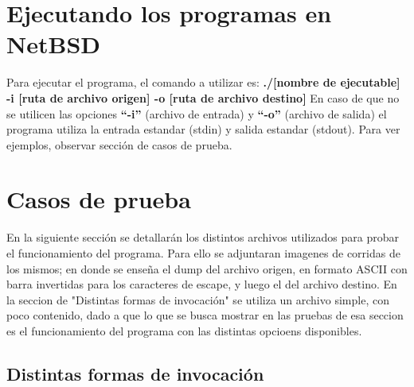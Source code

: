 \documentclass[a4paper,10pt]{article}
\begin{document}
\section{Ejecutando los programas en NetBSD}
  Para ejecutar el programa, el comando a utilizar es:
  \newline
  {\bf./[nombre de ejecutable] -i [ruta de archivo origen] -o [ruta de archivo destino]}
  \newline
  En caso de que no se utilicen las opciones {\bf ``-i''} (archivo de entrada) y {\bf ``-o''} (archivo de salida) el 
  programa utiliza la entrada estandar (stdin) y salida estandar (stdout). Para ver ejemplos, observar 
  secci\'on de casos de prueba.


\section{Casos de prueba}
En la siguiente secci\'on se detallar\'an los distintos archivos utilizados para probar el funcionamiento del
programa. Para ello se adjuntaran imagenes de corridas de los mismos; en donde se ense\~{n}a el dump del 
archivo origen, en formato ASCII con barra invertidas para los caracteres de escape, y luego el del 
archivo destino.
En la seccion de "Distintas formas de invocaci\'on" se utiliza un archivo simple, con poco contenido, dado a que lo que se busca
mostrar en las pruebas de esa seccion es el funcionamiento del programa con las distintas opcioens disponibles.

  \subsection{Distintas formas de invocaci\'on}
\end{document}
